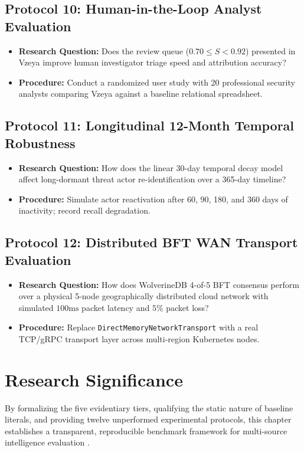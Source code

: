 \subsection{Protocol 10: Human-in-the-Loop Analyst Evaluation}
\begin{itemize}[noitemsep]
    \item \textbf{Research Question:} Does the review queue ($0.70 \le S < 0.92$) presented in Vzeya improve human investigator triage speed and attribution accuracy?
    \item \textbf{Procedure:} Conduct a randomized user study with 20 professional security analysts comparing Vzeya against a baseline relational spreadsheet.
\end{itemize}

\subsection{Protocol 11: Longitudinal 12-Month Temporal Robustness}
\begin{itemize}[noitemsep]
    \item \textbf{Research Question:} How does the linear 30-day temporal decay model affect long-dormant threat actor re-identification over a 365-day timeline?
    \item \textbf{Procedure:} Simulate actor reactivation after 60, 90, 180, and 360 days of inactivity; record recall degradation.
\end{itemize}

\subsection{Protocol 12: Distributed BFT WAN Transport Evaluation}
\begin{itemize}[noitemsep]
    \item \textbf{Research Question:} How does WolverineDB 4-of-5 BFT consensus perform over a physical 5-node geographically distributed cloud network with simulated $100\text{ms}$ packet latency and $5\%$ packet loss?
    \item \textbf{Procedure:} Replace \texttt{DirectMemoryNetworkTransport} with a real TCP/gRPC transport layer across multi-region Kubernetes nodes.
\end{itemize}

\section{Research Significance}
\label{sec:eval_significance}

By formalizing the five evidentiary tiers, qualifying the static nature of baseline literals, and providing twelve unperformed experimental protocols, this chapter establishes a transparent, reproducible benchmark framework for multi-source intelligence evaluation \cite{nowok2016synthpop, christen2012data}.
